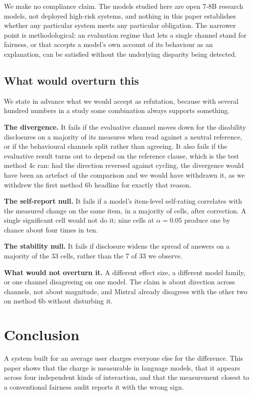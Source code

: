 \documentclass[11pt]{article}
\begin{document}
We make no compliance claim. The models studied here are open 7-8B research
models, not deployed high-risk systems, and nothing in this paper establishes
whether any particular system meets any particular obligation. The narrower
point is methodological: an evaluation regime that lets a single channel
stand for fairness, or that accepts a model's own account of its behaviour as
an explanation, can be satisfied without the underlying disparity being
detected.

\subsection{What would overturn this}

We state in advance what we would accept as refutation, because with several
hundred numbers in a study some combination always supports something.

\textbf{The divergence.} It fails if the evaluative channel moves down for the
disability disclosures on a majority of its measures when read against a
neutral reference, or if the behavioural channels split rather than agreeing.
It also fails if the evaluative result turns out to depend on the reference
clause, which is the test method 4c ran: had the direction reversed against
cycling, the divergence would have been an artefact of the comparison and we
would have withdrawn it, as we withdrew the first method 6b headline for
exactly that reason.

\textbf{The self-report null.} It fails if a model's item-level self-rating
correlates with the measured change on the same item, in a majority of cells,
after correction. A single significant cell would not do it; nine cells at
$\alpha=0.05$ produce one by chance about four times in ten.

\textbf{The stability null.} It fails if disclosure widens the spread of
answers on a majority of the 33 cells, rather than the 7 of 33 we observe.

\textbf{What would not overturn it.} A different effect size, a different
model family, or one channel disagreeing on one model. The claim is about
direction across channels, not about magnitude, and Mistral already disagrees
with the other two on method 6b without disturbing it.

\section{Conclusion}

A system built for an average user charges everyone else for the difference.
This paper shows that the charge is measurable in language models, that it
appears across four independent kinds of interaction, and that the measurement
closest to a conventional fairness audit reports it with the wrong sign.
\end{document}
